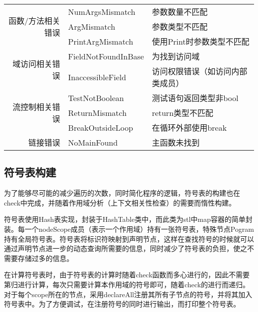 \begin{center}
\begin{longtable}{r l l}
        \cmidrule(lr){1-3}
        \multirow{3}{*}{函数/方法相关错误}
        & NumArgsMismatch & 参数数量不匹配 \\
        & ArgMismatch & 参数类型不匹配 \\
        & PrintArgMismatch & 使用Print时参数类型不匹配 \\

        \cmidrule(lr){1-3}
        \multirow{2}{*}{域访问相关错误}
        & FieldNotFoundInBase & 为找到访问域 \\
        & InaccessibleField & 访问权限错误（如访问内部类成员） \\

        \cmidrule(lr){1-3}
        \multirow{3}{*}{流控制相关错误}
        & TestNotBoolean & 测试语句返回类型非bool \\
        & ReturnMismatch & return类型不匹配 \\
        & BreakOutsideLoop & 在循环外部使用break \\

        \cmidrule(lr){1-3}
        \multirow{1}{*}{链接错误}
        & NoMainFound & 主函数未找到 \\
        \bottomrule
    \end{longtable}
\end{center}

\subsection{符号表构建}
\label{sub:fu_hao_biao_gou_jian_}
\par 为了能够尽可能的减少遍历的次数，同时简化程序的逻辑，符号表的构建也在check中完成，并随着作用域分析（上下文相关性检查）的需要而惰性构建。
\par 符号表使用Hash表实现，封装于HashTable类中，而此类为stl中map容器的简单封装。每一个nodeScope成员（表示一个作用域）持有一张符号表，特殊节点Pogram持有全局符号表。符号表将标识符映射到声明节点，这样在查找符号的时候就可以通过声明节点进一步的动态查询所需要的信息，同时减少了符号表的负担，使之不需要存储过多的信息。
\par 在计算符号表时，由于符号表的计算时随着check函数而多心进行的，因此不需要第归进行计算，每次只需要计算本作用域的符号即可，随着check的进行而递归。对于每个scope所在的节点，采用declareAll注册其所有子节点的符号，并将其加入符号表中。为了方便调试，在注册符号的同时进行输出，而打印整个符号表。

